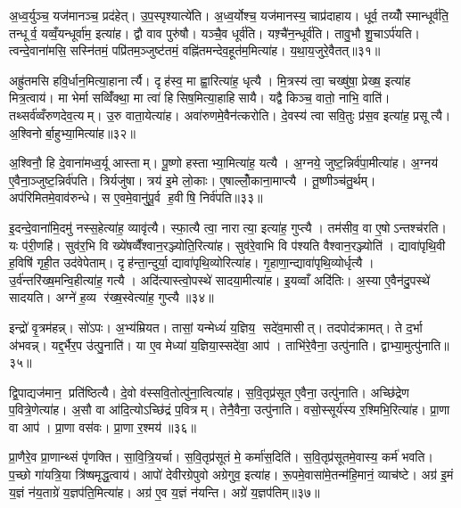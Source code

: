 अ॒ध्व॒र्युञ्च॒ यज॑मानञ्च॒ प्रद॑हेत्। उ॒प॒स्पृश्यात्ये॑ति। अ॒ध्व॒र्योश्च॒ यज॑मानस्य॒ चाप्र॑दाहाय। धूर्व॒ तय्योँस्मान्धूर्व॑ति॒ तन्धूर्व॒ यव्वँ॒यन्धूर्वा॑म॒ इत्या॑ह। द्वौ वाव पुरु॑षौ। यञ्चै॒व धूर्व॑ति। यश़्चै॑न॒न्धूर्व॑ति। तावु॒भौ शु॒चाऽर्प॑यति। त्वन्दे॒वाना॑मसि॒ सस्नि॑तमं॒ पप्रि॑तम॒ञ्जुष्ट॑तमं॒ वह्नि॑तमन्देव॒हूत॑म॒मित्या॑ह। य॒था॒य॒जुरे॒वैतत्॥३१॥

अह्रु॑तमसि हवि॒र्धान॒मित्या॒हानार्त्यै। दृह॑स्व॒ मा ह्वा॒रित्या॑ह॒ धृत्यै। मि॒त्रस्य॑ त्वा॒ चख्षु॑षा॒ प्रेख्ष॒ इत्या॑ह मित्र॒त्वाय॑। मा भेर्मा सव्विँ॑क्था॒ मा त्वा॑ हिसिष॒मित्या॒हाहिसायै। यद्वै किञ्च॒ वातो॒ नाभि॒ वाति॑। तथ्सर्व॑व्वँरुणदेव॒त्यम्। उ॒रु वाता॒येत्या॑ह। अवा॑रुणमे॒वैन॑त्करोति। दे॒वस्य॑ त्वा सवि॒तुः प्र॑स॒व इत्या॑ह॒ प्रसूत्यै। अ॒श्विनोर्बा॒हुभ्या॒मित्या॑ह॥३२॥

अ॒श्विनौ॒ हि दे॒वाना॑मध्व॒र्यू आस्ताम्। पू॒ष्णो हस्ताभ्या॒मित्या॑ह॒ यत्यै। अ॒ग्नये॒ जुष्ट॒न्निर्व॑पा॒मीत्या॑ह। अ॒ग्नय॑ ए॒वैना॒ञ्जुष्ट॒न्निर्व॑पति। त्रिर्यजु॑षा। त्रय॑ इ॒मे लो॒काः। ए॒षाल्लोँ॒काना॒माप्त्यै। तू॒ष्णीञ्च॑तु॒र्थम्। अप॑रिमितमे॒वाव॑रुन्धे। स ए॒वमे॒वानु॑पू॒र्व ह॒वीषि॒ निर्व॑पति॥३३॥

इ॒दन्दे॒वाना॑मि॒दमु॑ नस्स॒हेत्या॑ह॒ व्यावृ॑त्यै। स्फा॒त्यै त्वा॒ नारात्या॒ इत्या॑ह॒ गुप्त्यै। तम॑सीव॒ वा ए॒षोऽन्तश्च॑रति। यः प॑री॒णहि॑। सुव॑र॒भि वि ख्ये॑षव्वैँश्वान॒रञ्ज्योति॒रित्या॑ह। सुव॑रे॒वाभि वि प॑श्यति वैश्वान॒रञ्ज्योति॑। द्यावा॑पृथि॒वी ह॒विषि॑ गृही॒त उद॑वेपेताम्। दृह॑न्ता॒न्दुर्या॒ द्यावा॑पृथि॒व्योरित्या॑ह। गृ॒हाणा॒न्द्यावा॑पृथि॒व्योर्धृत्यै। उ॒र्व॑न्तरि॑ख्ष॒मन्वि॒हीत्या॑ह॒ गत्यै। अदि॑त्यास्त्वो॒पस्थे॑ सादया॒मीत्या॑ह। इ॒यव्वाँ अदि॑तिः। अ॒स्या ए॒वैन॑दु॒पस्थे॑ सादयति। अग्ने॑ ह॒व्य र॑ख्ष॒स्वेत्या॑ह॒ गुप्त्यै॥३४॥\anuvakamend[य॒ज्ञो वा आपो॒ धाम॑ प्र॒णीय॒ प्रच॑रत्यती॒यादे॒तद्बा॒हुभ्या॒मित्या॑ह ह॒वीषि॒ निर्व॑पति॒ गत्यै॑ च॒त्वारि॑ च]

इन्द्रो॑ वृ॒त्रम॑हन्न्। सो॑ऽपः। अ॒भ्य॑म्रियत। तासां॒ यन्मेध्यं॑ य॒ज्ञिय॒ सदे॑व॒मासीत्। तदपोद॑क्रामत्। ते द॒र्भा अ॑भवन्न्। यद्द॒र्भैर॒प उ॑त्पु॒नाति॑। या ए॒व मेध्या॑ य॒ज्ञिया॒स्सदे॑वा॒ आप॑। ताभि॑रे॒वैना॒ उत्पु॑नाति। द्वाभ्या॒मुत्पु॑नाति॥३५॥

द्वि॒पाद्यज॑मान॒ प्रति॑ष्ठित्यै। दे॒वो व॑स्सवि॒तोत्पु॑ना॒त्वित्या॑ह। स॒वि॒तृप्र॑सूत ए॒वैना॒ उत्पु॑नाति। अच्छि॑द्रेण प॒वित्रे॒णेत्या॑ह। अ॒सौ वा आ॑दि॒त्योऽच्छि॑द्रं प॒वित्रम्। तेनै॒वैना॒ उत्पु॑नाति। वसो॒स्सूर्य॑स्य र॒श्मिभि॒रित्या॑ह। प्रा॒णा वा आप॑। प्रा॒णा वस॑वः। प्रा॒णा र॒श्मय॑॥३६॥

प्रा॒णैरे॒व प्रा॒णान्थ्सं पृ॑णक्ति। सा॒वि॒त्रि॒यर्चा। स॒वि॒तृप्र॑सूतं मे॒ कर्मा॑स॒दिति॑। स॒वि॒तृप्र॑सूतमे॒वास्य॒ कर्म॑ भवति। प॒च्छो गा॑यत्रि॒या त्रि॑ष्षमृद्ध॒त्वाय॑। आपो॑ देवीरग्रेपुवो अग्रेगुव॒ इत्या॑ह। रू॒पमे॒वासा॑मे॒तन्म॑हि॒मानं॒ व्याच॑ष्टे। अग्र॑ इ॒मं य॒ज्ञं न॑य॒ताग्रे॑ य॒ज्ञप॑ति॒मित्या॑ह। अग्र॑ ए॒व य॒ज्ञं न॑यन्ति। अग्रे॑ य॒ज्ञप॑तिम्॥३७॥

